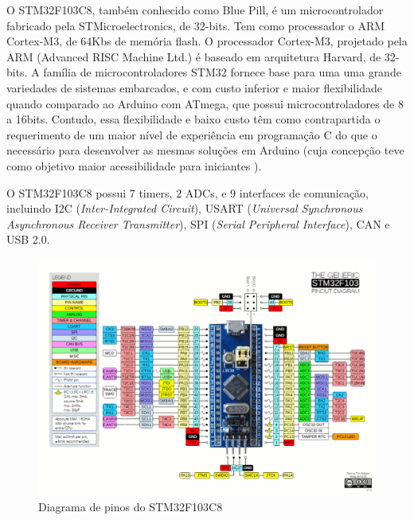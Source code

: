 O STM32F103C8, também conhecido como Blue Pill, é um microcontrolador fabricado
pela STMicroelectronics, de 32-bits. Tem como processador o ARM Cortex-M3, de
64Kbs de memória flash. O processador Cortex-M3, projetado pela ARM (Advanced
RISC Machine Ltd.) é  baseado em arquitetura Harvard, de 32-bits. A família de
microcontroladores STM32 fornece base para uma uma grande variedades de
sistemas embarcados, e com custo inferior e maior flexibilidade quando comparado
ao Arduino com ATmega, que possui microcontroladores de 8 a 16bits. Contudo,
essa flexibilidade e baixo custo têm como contrapartida o requerimento de um
maior nível de experiência em programação C do que o necessário para
desenvolver as mesmas soluções em Arduino (cuja concepção teve como objetivo
maior acessibilidade para iniciantes \cite{cortex_m3}).

O STM32F103C8 possui 7 timers, 2 ADCs, e 9 interfaces de comunicação, incluindo
I2C (\textit{Inter-Integrated Circuit}), USART (\textit{Universal Synchronous
Asynchronous Receiver Transmitter}), SPI (\textit{Serial Peripheral Interface}),
CAN e USB 2.0.


\begin{figure}[h]
	\centering
	\includegraphics[width=1.0\textwidth]{figures/stm32f1_pinout}
	\caption{Diagrama de pinos do STM32F103C8}
\end{figure}

